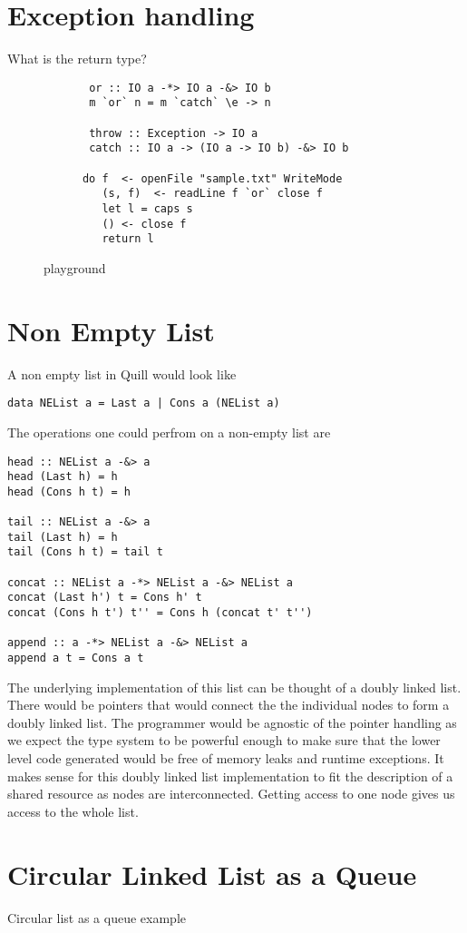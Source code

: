 \section{Exception handling}

What is the return type?
\begin{figure}[h]
  \begin{framed}
    \begin{verbatim}
       or :: IO a -*> IO a -&> IO b
       m `or` n = m `catch` \e -> n

       throw :: Exception -> IO a
       catch :: IO a -> (IO a -> IO b) -&> IO b

      do f  <- openFile "sample.txt" WriteMode
         (s, f)  <- readLine f `or` close f
         let l = caps s
         () <- close f
         return l

    \end{verbatim}
  \end{framed}
  \caption{playground}
  \label{fig:playground}
\end{figure}



\section{Non Empty List}\label{sec:dll-example}
A non empty list in Quill would look like
\begin{verbatim}
data NEList a = Last a | Cons a (NEList a)
\end{verbatim}

The operations one could perfrom on a non-empty list are
\begin{verbatim}
head :: NEList a -&> a
head (Last h) = h
head (Cons h t) = h

tail :: NEList a -&> a
tail (Last h) = h
tail (Cons h t) = tail t

concat :: NEList a -*> NEList a -&> NEList a
concat (Last h') t = Cons h' t
concat (Cons h t') t'' = Cons h (concat t' t'')

append :: a -*> NEList a -&> NEList a
append a t = Cons a t
\end{verbatim}

The underlying implementation of this list can be thought of a doubly
linked list. There would be pointers that would connect the the individual nodes to form a doubly linked list.
The programmer would be agnostic of the pointer handling as we expect the type system to be powerful enough to
make sure that the lower level code generated would be free of memory leaks and runtime exceptions.
It makes sense for this doubly linked list implementation to fit the description of a shared resource as nodes
are interconnected. Getting access to one node gives us access to the whole list.



\section{Circular Linked List as a Queue}\label{sec:queue-example}

Circular list as a queue example



